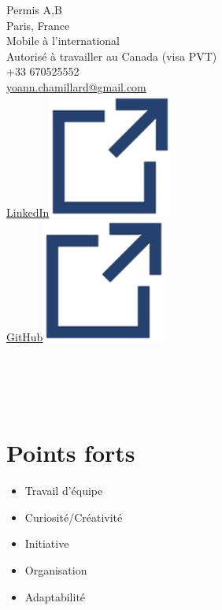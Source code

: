 \documentclass[]{friggeri-cv}
\begin{document}
\begin{aside}
Permis A,B\\
\vspace{2.5mm}
Paris, France\\
\vspace{1.5mm}
Mobile à l'international\\
Autorisé à travailler au Canada (visa PVT)\\
\vspace{2.5mm}
+33 670525552\\
\href{mailto:yoann.chamillard@gmail.com}{\small yoann.chamillard@gmail.com}\\
\vspace{2.5mm}
\href{http://fr.linkedin.com/in/yoannchamillard}{LinkedIn\hspace{1.5mm}\includegraphics[scale=0.075]{res/img/hlink.png}}\\
\href{https://github.com/Nokheenig?tab=stars}{GitHub\hspace{1.5mm}\includegraphics[scale=0.075]{res/img/hlink.png}}\\
\vspace{2.5mm}
\\
\\
\\
\\
\vspace{2.5mm}%

\section{Points forts}
\begin{itemize}
\item Travail d'équipe
\item Curiosité/Créativité
\item Initiative
\item Organisation
\item Adaptabilité
\end{itemize}

\end{aside}
\end{document}
